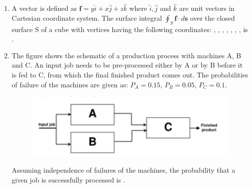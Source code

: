 \documentclass[journal,12pt,onecolumn]{IEEEtran}
\theoremstyle{remark}
\begin{document}
\begin{enumerate}
    \hfill{}
        \begin{enumerate}
        \end{enumerate}

    \item A vector is defined as $\mathbf{f} = y\hat{i} + x\hat{j} + z\hat{k}$ where $\hat{i}, \hat{j}$ and $\hat{k}$ are unit vectors in Cartesian  coordinate system. The surface integral $\oint_S \mathbf{f} \cdot d\mathbf{s}$ over the closed surface S of a cube with vertices having the following coordinates: , , , , , , ,  is \underline{\hspace{2cm}}.

    \hfill{}

    

    \item The figure shows the schematic of a production process with machines A, B and C. An input job needs to be pre-processed either by A or by B before it is fed to C, from which the final finished product comes out. The probabilities of failure of the machines are given as: $P_A = 0.15$, $P_B = 0.05$, $P_C = 0.1$.
    \begin{figure}[H]
        \centering
        \includegraphics[width=0.4\columnwidth]{q5}
        \caption*{}
        \label{Q5}
    \end{figure}
    Assuming independence of failures of the machines, the probability that a given job is successfully processed  is \underline{\hspace{2cm}}.

    \hfill{}

    


\end{enumerate}
\end{document}
